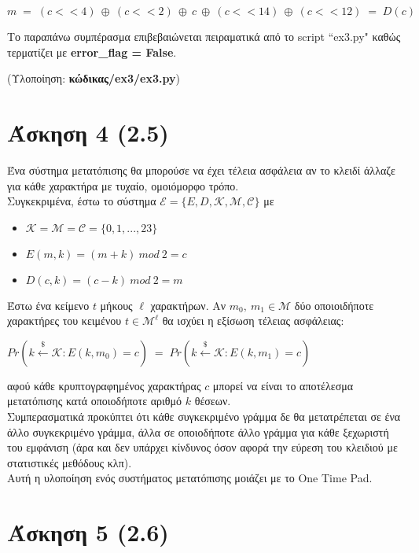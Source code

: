 \documentclass[12pt]{article}
\newcommand{\lt}{\latintext}
\newcommand{\xor}{\ensuremath{\oplus}}
\begin{document}
{\large
\[
m\; = \;(c << 4)\:\xor\:(c << 2)\:\xor\:c\:\xor\:(c << 14)\:\xor\:(c << 12)\; = \;D(c)
\]
}

\vspace{0.1in}

\noindent
Το παραπάνω συμπέρασμα επιβεβαιώνεται πειραματικά από το 
{\lt script ``ex3.py"} καθώς τερματίζει με 
\textbf{{\lt error\_flag = False}}. 
\vspace{0.2in}

\noindent
(Υλοποίηση: \textbf{κώδικας/{\lt ex3/ex3.py}})


\section*{Άσκηση 4 (2.5)}

Ένα σύστημα μετατόπισης θα μπορούσε να έχει τέλεια ασφάλεια αν το κλειδί άλλαζε για κάθε χαρακτήρα με τυχαίο, ομοιόμορφο τρόπο. \\ 
Συγκεκριμένα, έστω το σύστημα 
$\mathcal{E} = \{E, D, \mathcal{K}, \mathcal{M}, \mathcal{C}\}$ 
με
\begin{itemize}
	\item $\mathcal{K} = \mathcal{M} = \mathcal{C} = \{0, 1, ..., 23\}$
	\item $E(m, k) = (m + k)\:mod\:2 = c$
	\item $D(c, k) = (c - k)\:mod\:2 = m$
\end{itemize}
Έστω ένα κείμενο $t$ μήκους $\ell$ χαρακτήρων. Αν $m_{0},\:m_{1} \in \mathcal{M}$ δύο οποιοιδήποτε χαρακτήρες του κειμένου $t\in\mathcal{M}^{\ell}$ θα ισχύει η εξίσωση τέλειας 
ασφάλειας:
\begin{center}
	$Pr(k \xleftarrow{\$}\mathcal{K}: E(k, m_{0}) = c)\;=\; 
	Pr(k \xleftarrow{\$}\mathcal{K}: E(k, m_{1}) = c)$
\end{center}
αφού κάθε κρυπτογραφημένος χαρακτήρας $c$ μπορεί να είναι το αποτέλεσμα 
μετατόπισης κατά οποιοδήποτε αριθμό $k$ θέσεων.  \\
\indent
Συμπερασματικά προκύπτει ότι κάθε συγκεκριμένο γράμμα δε θα 
μετατρέπεται σε ένα άλλο συγκεκριμένο γράμμα, άλλα σε οποιοδήποτε άλλο 
γράμμα για κάθε ξεχωριστή του εμφάνιση (άρα και δεν υπάρχει κίνδυνος 
όσον αφορά την εύρεση του κλειδιού με στατιστικές μεθόδους κλπ).\\ 
\indent
Αυτή η υλοποίηση ενός συστήματος μετατόπισης μοιάζει με το {\lt One Time Pad}.

\pagebreak

\section*{Άσκηση 5 (2.6)}
\end{document}

